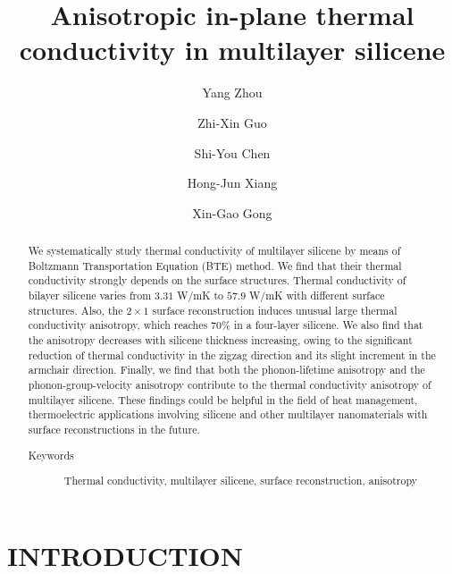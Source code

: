 \documentclass[review]{elsarticle}
\begin{document}
\title{Anisotropic in-plane thermal conductivity in multilayer silicene}
\author[1,3]{Yang Zhou}
\author[2,1]{Zhi-Xin Guo}
\author[1]{Shi-You Chen}
\author[1]{Hong-Jun Xiang}
\author[1,3]{Xin-Gao Gong}

\address[1]{Key Laboratory for Computational Physical Science (Ministry of Education), State Key Laboratory of Surface Physics and Department of Physics, Fudan University, Shanghai 200433, China}
\address[2]{Department of Physics, Xiangtan University, Xiangtan 411105, China}
\address[3]{Collaborative Innovation Center of Advanced Microstructures, Nanjing 210093, Jiangsu, China}
\begin{abstract}
  We systematically study thermal conductivity of multilayer silicene by means of Boltzmann Transportation Equation (BTE) method.  We find that their thermal conductivity strongly depends on the surface structures. Thermal conductivity of bilayer silicene varies from $3.31$ W/mK to $57.9$ W/mK with different surface structures. Also, the $2\times1$ surface reconstruction induces unusual large thermal conductivity anisotropy, which reaches 70\%  in a four-layer silicene.  We also find that the anisotropy decreases with silicene thickness increasing, owing to the significant reduction of thermal conductivity in the zigzag direction and its slight increment  in the armchair direction.
  Finally, we find that both the phonon-lifetime anisotropy and the phonon-group-velocity  anisotropy contribute to the thermal conductivity anisotropy of multilayer silicene.
  These findings could be helpful in the field of heat management, thermoelectric applications involving silicene and other multilayer nanomaterials  with surface reconstructions in the future.

  \begin{description}
    \item[Keywords]
          Thermal conductivity, multilayer silicene, surface reconstruction, anisotropy
  \end{description}
\end{abstract}

\maketitle

\section{INTRODUCTION}
\end{document}
